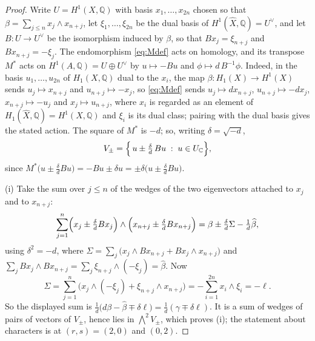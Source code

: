 \documentclass[11pt,reqno]{amsart}
\theoremstyle{plain}
\theoremstyle{definition}
\theoremstyle{remark}
\newcommand{\QQ}{\mathbb{Q}}
\newcommand{\CC}{\mathbb{C}}
\begin{document}
\begin{proof}
Write $U=H^{1}(X,\QQ)$ with basis $x_{1},\dots,x_{2n}$ chosen so that
$\beta=\sum_{j\le n}x_{j}\wedge x_{n+j}$, let $\xi_{1},\dots,\xi_{2n}$ be the
dual basis of $H^{1}(\widehat{X},\QQ)=U^{\vee}$, and let $B\colon U\to U^{\vee}$
be the isomorphism induced by $\beta$, so that $Bx_{j}=\xi_{n+j}$ and
$Bx_{n+j}=-\xi_{j}$. The endomorphism \eqref{eq:Mdef} acts on homology, and
its transpose $M^{*}$ acts on $H^{1}(A,\QQ)=U\oplus U^{\vee}$ by
$u\mapsto -Bu$ and $\phi\mapsto d\,B^{-1}\phi$. Indeed, in the basis
$u_{1},\dots,u_{2n}$ of $H_{1}(X,\QQ)$ dual to the $x_{i}$, the map
$\beta\colon H_{1}(X)\to H^{1}(X)$ sends $u_{j}\mapsto x_{n+j}$ and
$u_{n+j}\mapsto-x_{j}$, so \eqref{eq:Mdef} sends $u_{j}\mapsto dx_{n+j}$,
$u_{n+j}\mapsto-dx_{j}$, $x_{n+j}\mapsto-u_{j}$ and $x_{j}\mapsto u_{n+j}$,
where $x_{i}$ is regarded as an element of
$H_{1}(\widehat X,\QQ)=H^{1}(X,\QQ)$ and $\xi_{i}$ is its dual class; pairing
with the dual basis gives the stated action. The square of $M^{*}$ is $-d$;
so, writing $\delta=\sqrt{-d}$,
\begin{equation}\label{eq:splitVpm}
  V_{\pm}=\Bigl\{\,u\pm\tfrac{\delta}{d}\,Bu\;:\;u\in U_{\CC}\Bigr\},
\end{equation}
since $M^{*}\bigl(u\pm\tfrac{\delta}{d}Bu\bigr)
=-Bu\pm\delta u=\pm\delta\bigl(u\pm\tfrac{\delta}{d}Bu\bigr)$.

(i) Take the sum over $j\le n$ of the wedges of the two eigenvectors attached
to $x_{j}$ and to $x_{n+j}$:
\[
  \sum_{j=1}^{n}
  \Bigl(x_{j}\pm\tfrac{\delta}{d}Bx_{j}\Bigr)\wedge
  \Bigl(x_{n+j}\pm\tfrac{\delta}{d}Bx_{n+j}\Bigr)
  =\beta\pm\tfrac{\delta}{d}\Sigma-\tfrac{1}{d}\widehat{\beta},
\]
using $\delta^{2}=-d$, where
$\Sigma=\sum_{j}\bigl(x_{j}\wedge Bx_{n+j}+Bx_{j}\wedge x_{n+j}\bigr)$ and
$\sum_{j}Bx_{j}\wedge Bx_{n+j}=\sum_{j}\xi_{n+j}\wedge(-\xi_{j})
=\widehat{\beta}$. Now
\[
  \Sigma=\sum_{j=1}^{n}\bigl(x_{j}\wedge(-\xi_{j})
        +\xi_{n+j}\wedge x_{n+j}\bigr)
   =-\sum_{i=1}^{2n}x_{i}\wedge\xi_{i}=-\ell .
\]
So the displayed sum is $\tfrac1d\bigl(d\beta-\widehat{\beta}\mp\delta\ell\bigr)
=\tfrac1d(\gamma\mp\delta\ell)$. It is a sum of wedges of pairs of vectors of
$V_{\pm}$, hence lies in $\bigwedge^{2}V_{\pm}$, which proves (i); the
statement about characters is  at $(r,s)=(2,0)$ and
$(0,2)$.


\end{proof}
\end{document}
